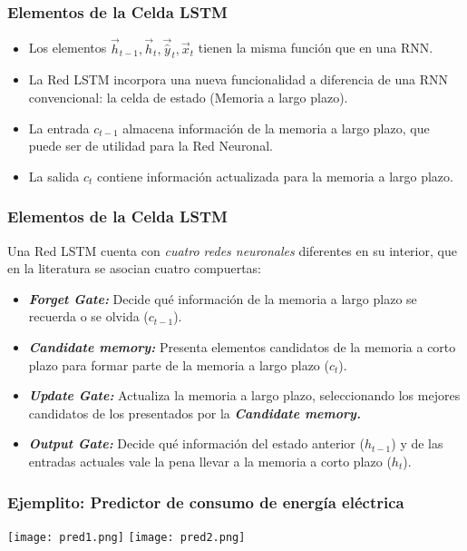 \begin{frame}
	\frametitle{Elementos de la Celda LSTM}
	\begin{itemize}
		\item Los elementos $\vec{h}_{t-1}, \vec{h}_{t}, \vec{\hat{y}}_{t}, \vec{x}_{t}$ tienen la misma función que en una RNN.
		\item La Red LSTM incorpora una nueva funcionalidad a diferencia de una RNN convencional: la celda de estado (Memoria a largo plazo).
		\item La entrada $c_{t-1}$ almacena información de la memoria a largo plazo, que puede ser de utilidad para la Red Neuronal.
		\item La salida $c_{t}$ contiene información actualizada para la memoria a largo plazo.
	\end{itemize}
\end{frame}

\begin{frame}
	\frametitle{Elementos de la Celda LSTM}
	Una Red LSTM cuenta con \textit{cuatro redes neuronales} diferentes en su interior, que en la literatura se asocian cuatro compuertas:
	
	\begin{itemize}
		\item \textbf{\textit{Forget Gate:}} Decide qué información de la memoria a largo plazo se recuerda o se olvida ($c_{t-1}$).
		\item \textbf{\textit{Candidate memory:}} Presenta elementos candidatos de la memoria a corto plazo para formar parte de la memoria a largo plazo ($c_{t}$).
		\item \textbf{\textit{Update Gate:}} Actualiza la memoria a largo plazo, seleccionando los mejores candidatos de los presentados por la \textbf{\textit{Candidate memory.}}
		\item \textbf{\textit{Output Gate:}} Decide qué información del estado anterior ($h_{t-1}$) y de las entradas actuales vale la pena llevar a la memoria a corto plazo ($h_{t}$).
	\end{itemize}
\end{frame}



\begin{frame}
	\frametitle{Ejemplito: Predictor de consumo de energía eléctrica}
	\vspace{-5mm}
	
	\begin{center}
		\texttt{[image: pred1.png]}
		\texttt{[image: pred2.png]}
	\end{center}
\end{frame}
